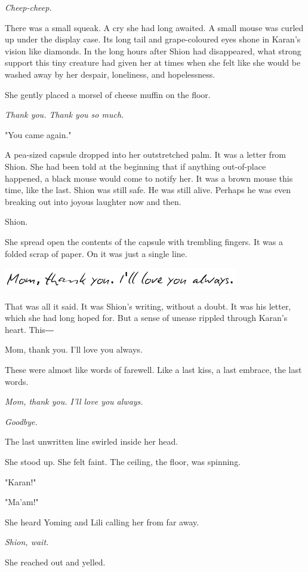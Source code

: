 \emph{Cheep-cheep.}

There was a small squeak. A cry she had long awaited. A small mouse was
curled up under the display case. Its long tail and grape-coloured eyes
shone in Karan's vision like diamonds. In the long hours after Shion had
disappeared, what strong support this tiny creature had given her at
times when she felt like she would be washed away by her despair,
loneliness, and hopelessness.

She gently placed a morsel of cheese muffin on the floor.

\emph{Thank you. Thank you so much.}

"You came again."

A pea-sized capsule dropped into her outstretched palm. It was a letter
from Shion. She had been told at the beginning that if anything
out-of-place happened, a black mouse would come to notify her. It was a
brown mouse this time, like the last. Shion was still safe. He was still
alive. Perhaps he was even breaking out into joyous laughter now and
then.

Shion.

She spread open the contents of the capsule with trembling fingers. It
was a folded scrap of paper. On it was just a single line.

\includegraphics{Images/memo6.png}

That was all it said. It was Shion's writing, without a doubt. It was
his letter, which she had long hoped for. But a sense of unease rippled
through Karan's heart. This―

Mom, thank you. I'll love you always.

These were almost like words of farewell. Like a last kiss, a last
embrace, the last words.

\emph{Mom, thank you. I'll love you always.}

\emph{Goodbye.}

The last unwritten line swirled inside her head.

She stood up. She felt faint. The ceiling, the floor, was spinning.

"Karan!"

"Ma'am!"

She heard Yoming and Lili calling her from far away.

\emph{Shion, wait.}

She reached out and yelled.

